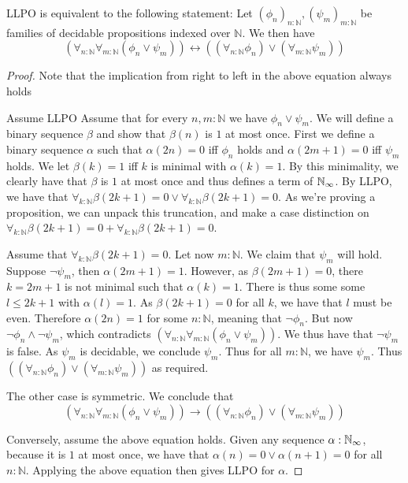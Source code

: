 \documentclass{../util/zariski-small}
\begin{document}
\begin{corollary}\label{corAlternativeLLPO}
  LLPO is equivalent to the following statement:
  Let $(\phi_n)_{n:\mathbb N}, (\psi_m)_{m:\mathbb N}$ be families of decidable propositions indexed over $\mathbb N$.
  We then have 
  \begin{equation}
    (\forall_{n:\mathbb N} \forall_{m:\mathbb N} (\phi_n \vee \psi_m) )
    \leftrightarrow
    ((\forall_{n:\mathbb N} \phi_n) \vee (\forall_{m:\mathbb N} \psi_m) )
  \end{equation}
\end{corollary}
\begin{proof}
  Note that the implication from right to left in the above equation always holds
  

  Assume LLPO
  Assume that for every $n,m:\mathbb N$ we have $\phi_n \vee \psi_m$. 
  We will define a binary sequence $\beta$ and show that $\beta(n)$ is $1$ at most once. 
  First we define a binary sequence $\alpha$
  such that $\alpha(2n) = 0$ iff $\phi_n$ holds and $\alpha(2m+1) = 0$ iff $\psi_m$ holds. 
  We let $\beta(k) = 1$ iff $k$ is minimal with $\alpha(k) = 1$. 
  By this minimality, we clearly have that $\beta$ is $1$ at most once and thus defines a term of $\mathbb{N}_{\infty}$. 
  By LLPO, we have that 
  $\forall_{k:\mathbb N} \beta(2k+1) = 0\vee \forall_{k:\mathbb N} \beta(2k+1) = 0$. 
  As we're proving a proposition, we can unpack this truncation, and make a case distinction on
  $\forall_{k:\mathbb N} \beta(2k+1) = 0 + \forall_{k:\mathbb N} \beta(2k+1) = 0$. 

  Assume that $\forall_{k:\mathbb N} \beta(2k+1) = 0$. 
  Let now $m:\mathbb N$. We claim that $\psi_m$ will hold. 
  Suppose $\neg \psi_m$, then $\alpha(2m+1) = 1$. However, as $\beta(2m+1) = 0$, there 
  $k = 2m+1$ is not minimal such that $\alpha(k)  = 1$.
  There is thus some  some $l\leq 2k+1$ with $\alpha(l) = 1$. 
  As $\beta(2k+1) = 0$ for all $k$, we have that $l$ must be even. 
  Therefore $\alpha(2n) = 1$ for some $n:\mathbb N$, meaning that $\neg \phi_n$. 
  But now $\neg \phi_n \wedge \neg \psi_m$, which contradicts 
  $(\forall_{n:\mathbb N} \forall_{m:\mathbb N} (\phi_n \vee \psi_m) )$. 
  We thus have that $\neg \psi_m$ is false. As $\psi_m$ is decidable, we conclude $\psi_m$. 
  Thus for all $m:\mathbb N$, we have $\psi_m$. Thus 
  $((\forall_{n:\mathbb N} \phi_n) \vee (\forall_{m:\mathbb N} \psi_m) )$ 
  as required. 

  The other case is symmetric. We conclude that 
  \begin{equation}
    (\forall_{n:\mathbb N} \forall_{m:\mathbb N} (\phi_n \vee \psi_m) )
    \to
    ((\forall_{n:\mathbb N} \phi_n) \vee (\forall_{m:\mathbb N} \psi_m) )
  \end{equation}

  Conversely, assume the above equation holds. 
  Given any sequence $\alpha:\mathbb{N}_{\infty}$, because it is $1$ at most once, we have that 
  $\alpha(n) = 0 \vee \alpha(n+1) = 0$ for all $n:\mathbb N$. Applying the above equation then gives LLPO for $\alpha$. 
\end{proof}
\end{document}
